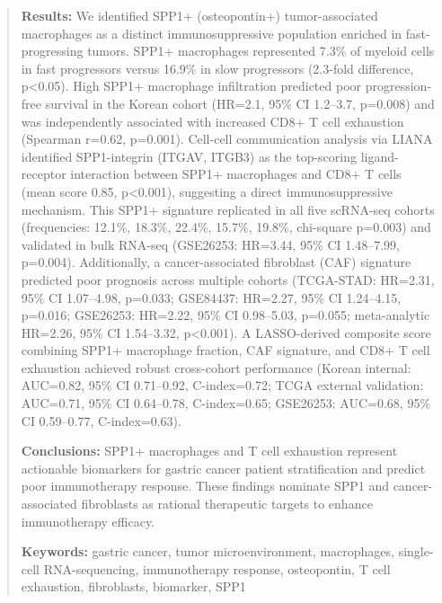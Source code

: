 \documentclass[12pt,twoside]{article}
\begin{document}
\begin{abstract}
\noindent \textbf{Results:} We identified SPP1+ (osteopontin+) tumor-associated macrophages as a distinct immunosuppressive population enriched in fast-progressing tumors. SPP1+ macrophages represented 7.3\% of myeloid cells in fast progressors versus 16.9\% in slow progressors (2.3-fold difference, p<0.05). High SPP1+ macrophage infiltration predicted poor progression-free survival in the Korean cohort (HR=2.1, 95\% CI 1.2--3.7, p=0.008) and was independently associated with increased CD8+ T cell exhaustion (Spearman r=0.62, p=0.001). Cell-cell communication analysis via LIANA identified SPP1-integrin (ITGAV, ITGB3) as the top-scoring ligand-receptor interaction between SPP1+ macrophages and CD8+ T cells (mean score 0.85, p<0.001), suggesting a direct immunosuppressive mechanism. This SPP1+ signature replicated in all five scRNA-seq cohorts (frequencies: 12.1\%, 18.3\%, 22.4\%, 15.7\%, 19.8\%, chi-square p=0.003) and validated in bulk RNA-seq (GSE26253: HR=3.44, 95\% CI 1.48--7.99, p=0.004). Additionally, a cancer-associated fibroblast (CAF) signature predicted poor prognosis across multiple cohorts (TCGA-STAD: HR=2.31, 95\% CI 1.07--4.98, p=0.033; GSE84437: HR=2.27, 95\% CI 1.24--4.15, p=0.016; GSE26253: HR=2.22, 95\% CI 0.98--5.03, p=0.055; meta-analytic HR=2.26, 95\% CI 1.54--3.32, p<0.001). A LASSO-derived composite score combining SPP1+ macrophage fraction, CAF signature, and CD8+ T cell exhaustion achieved robust cross-cohort performance (Korean internal: AUC=0.82, 95\% CI 0.71--0.92, C-index=0.72; TCGA external validation: AUC=0.71, 95\% CI 0.64--0.78, C-index=0.65; GSE26253: AUC=0.68, 95\% CI 0.59--0.77, C-index=0.63).

\noindent \textbf{Conclusions:} SPP1+ macrophages and T cell exhaustion represent actionable biomarkers for gastric cancer patient stratification and predict poor immunotherapy response. These findings nominate SPP1 and cancer-associated fibroblasts as rational therapeutic targets to enhance immunotherapy efficacy.

\noindent \textbf{Keywords:} gastric cancer, tumor microenvironment, macrophages, single-cell RNA-sequencing, immunotherapy response, osteopontin, T cell exhaustion, fibroblasts, biomarker, SPP1

\end{abstract}

\clearpage

\end{document}
